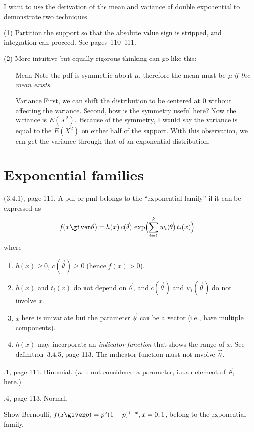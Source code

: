 \documentclass[12pt]{article}
\begin{document}
I want to use the derivation of the mean and variance of double
exponential to demonstrate two techniques.

(1) Partition the support so that the absolute value sign is stripped,
and integration can proceed. See pages~110--111.

(2) More intuitive but equally rigorous thinking can go like this:
\begin{enumerate}
\item[Mean]
Note the pdf is symmetric about $\mu$, therefore the mean must be $\mu$
\emph{if the mean exists}.
\item[Variance]
First, we can shift the distribution to be centered at 0 without
affecting the variance.
Second, how is the symmetry useful here?
Now the variance is $E(X^2)$.
Because of the symmetry, I would say the variance is equal to the
$E(X^2)$ on either half of the support.
With this observation, we can get the variance through that of
an exponential distribution.
\end{enumerate}

\section{Exponential families}

 (3.4.1), page 111.
A pdf or pmf belongs to the ``exponential family''
if it can be expressed as
\[
f(x \given \vec{\theta})
= h(x)\, c(\vec{\theta})\,
    \exp\Bigl(\sum_{i=1}^k w_i(\vec{\theta})\, t_i(x)\Bigr)
\]
where
\begin{enumerate}
\item $h(x) \ge 0$, $c(\vec{\theta}) \ge 0$ (hence $f(x) > 0$).
\item $h(x)$ and $t_i(x)$ do not depend on $\vec{\theta}$,
    and $c(\vec{\theta})$ and $w_i(\vec{\theta})$ do not involve $x$.
\item $x$ here is univariate but the parameter $\vec{\theta}$ can be a
    vector (i.e., have multiple components).
\item $h(x)$ may incorporate an \emph{indicator function} that shows the range
of $x$. See definition~3.4.5, page 113. The indicator function must not
involve $\vec{\theta}$.
\end{enumerate}

.1, page 111. Binomial.
($n$ is not considered a parameter, i.e.\@ an element of $\vec{\theta}$, here.)

.4, page 113. Normal.

\example Show Bernoulli, $f(x \given p) = p^x (1-p)^{1-x}, x = 0, 1$,
    belong to the exponential family.
\end{document}
